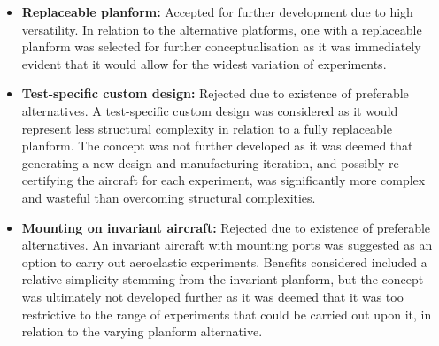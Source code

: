 \begin{itemize}
    \item \textbf{Replaceable planform:} Accepted for further development due to high versatility. In relation to the alternative platforms, one with a replaceable planform was selected for further conceptualisation as it was immediately evident that it would allow for the widest variation of experiments.
    \item \textbf{Test-specific custom design:} Rejected due to existence of preferable alternatives. A test-specific custom design was considered as it would represent less structural complexity in relation to a fully replaceable planform. The concept was not further developed as it was deemed that generating a new design and manufacturing iteration, and possibly re-certifying the aircraft for each experiment, was significantly more complex and wasteful than overcoming structural complexities.
    \item \textbf{Mounting on invariant aircraft:} Rejected due to existence of preferable alternatives. An invariant aircraft with mounting ports was suggested as an option to carry out aeroelastic experiments. Benefits considered included a relative simplicity stemming from the invariant planform, but the concept was ultimately not developed further as it was deemed that it was too restrictive to the range of experiments that could be carried out upon it, in relation to the varying planform alternative.
\end{itemize}

